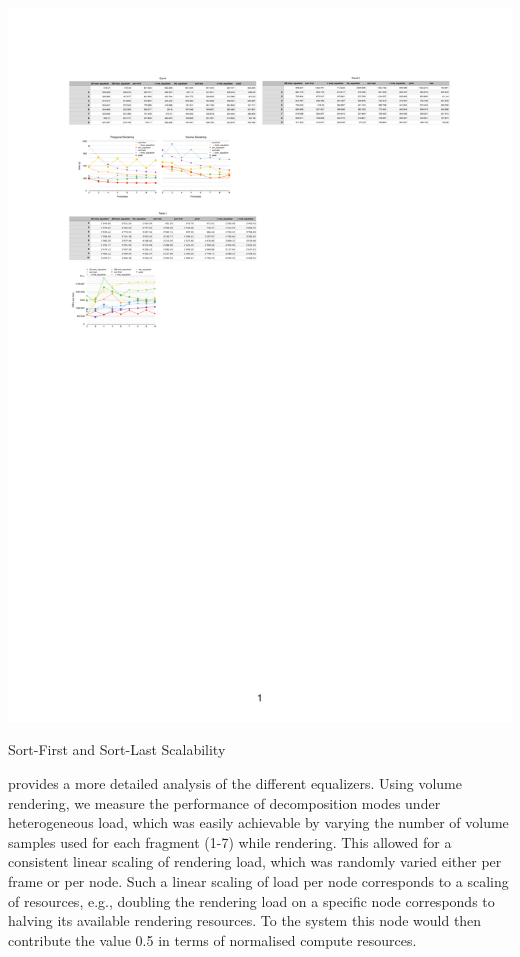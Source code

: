 \begin{benchmark}[h!t]
  \includegraphics[width=\textwidth]{results/compounds}
  \caption{\label{rCompounds}Sort-First and Sort-Last Scalability}
\end{benchmark}

 provides a more detailed analysis of the different
equalizers. Using volume rendering, we measure the performance of decomposition
modes under heterogeneous load, which was easily achievable by varying the
number of volume samples used for each fragment (1-7) while rendering. This
allowed for a consistent linear scaling of rendering load, which was randomly
varied either per frame or per node. Such a linear scaling of load per node
corresponds to a scaling of resources, e.g., doubling the rendering load on a
specific node corresponds to halving its available rendering resources. To the
system this node would then contribute the value 0.5 in terms of normalised
compute resources.

